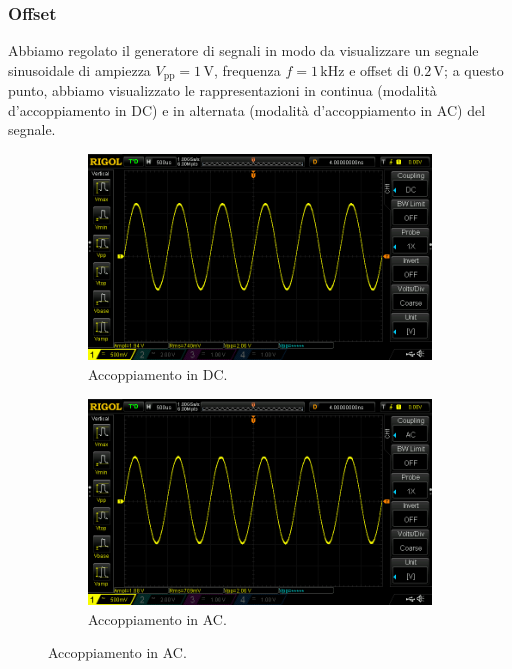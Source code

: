 \documentclass[a4paper]{article}
\begin{document}
			\subsubsection{Offset}
				Abbiamo regolato il generatore di segnali in modo da visualizzare un segnale sinusoidale di ampiezza $ V_{\mathrm{pp}} = 1 \, \mathrm{V} $, frequenza $ f = 1 \, \mathrm{kHz} $ e offset di $ 0.2 \, \mathrm{V} $; a questo punto, abbiamo visualizzato le rappresentazioni in continua (modalità d'accoppiamento in DC) e in alternata (modalità d'accoppiamento in AC) del segnale.
				\begin{figure}[h!]
					\centering
					\begin{subfigure}{0.4\textwidth}
						\centering
						\includegraphics[scale=0.2]{offsetPositivoDC}
						\caption{Accoppiamento in DC.}
					\end{subfigure}
					\begin{subfigure}{0.4\textwidth}
						\centering
						\includegraphics[scale=0.2]{offsetPositivoAC}
						\caption{Accoppiamento in AC.}
					\end{subfigure}
					\label{fig:offsetPositivo}
				\end{figure}
\end{document}
